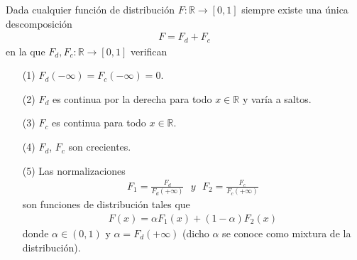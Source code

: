 \begin{teo}
    Dada cualquier función de distribución $F: \mathbb{R} \longrightarrow [0,1]$ siempre existe una única descomposición
    \begin{align*}
        F = F_d + F_c
    \end{align*}
    en la que $F_d,F_c: \mathbb{R} \longrightarrow [0,1]$ verifican
    \begin{enumerate}
        \item[(1)] $F_d(-\infty) = F_c(-\infty) = 0$.
        \item[(2)] $F_d$ es continua por la derecha para todo $x \in \mathbb{R}$ y varía a saltos.
        \item[(3)] $F_c$ es continua para todo $x \in \mathbb{R}$.
        \item[(4)] $F_d$, $F_c$ son crecientes.
        \item[(5)] Las normalizaciones
              \begin{align*}
                  F_1 = \frac{F_d}{F_d(+\infty)} \ \ \ y \ \ \ F_2 = \frac{F_c}{F_c(+\infty)}
              \end{align*}
              son funciones de distribución tales que
              \begin{align*}
                  F(x) = \alpha F_1(x) + (1 - \alpha)F_2(x)
              \end{align*}
              donde $\alpha \in (0,1)$ y $\alpha = F_d(+\infty)$ (dicho $\alpha$ se conoce como mixtura de la distribución).
    \end{enumerate}
\end{teo}
